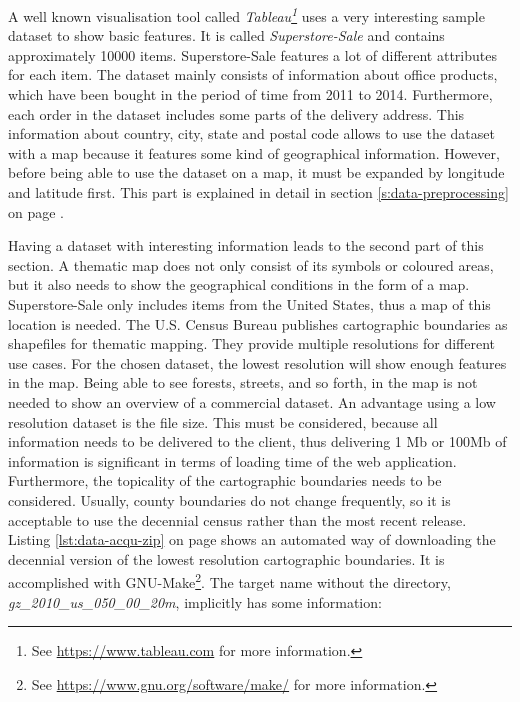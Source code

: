 A well known visualisation tool called \textit{Tableau\footnote{See \href{https://www.tableau.com}{https://www.tableau.com} for more information.}} uses a very interesting sample dataset to show basic features. It is called \textit{Superstore-Sale} and contains approximately 10000 items. Superstore-Sale features a lot of different attributes for each item. The dataset mainly consists of information about office products, which have been bought in the period of time from 2011 to 2014. Furthermore, each order in the dataset includes some parts of the delivery address. This information about country, city, state and postal code allows to use the dataset with a map because it features some kind of geographical information. However, before being able to use the dataset on a map, it must be expanded by longitude and latitude first. This part is explained in detail in section \ref{s:data-preprocessing} on page \pageref{s:data-preprocessing}.

Having a dataset with interesting information leads to the second part of this section. A thematic map does not only consist of its symbols or coloured areas, but it also needs to show the geographical conditions in the form of a map. Superstore-Sale only includes items from the United States, thus a map of this location is needed. The U.S. Census Bureau publishes cartographic boundaries as shapefiles for thematic mapping. They provide multiple resolutions for different use cases. For the chosen dataset, the lowest resolution will show enough features in the map. Being able to see forests, streets, and so forth, in the map is not needed to show an overview of a commercial dataset. An advantage using a low resolution dataset is the file size. This must be considered, because all information needs to be delivered to the client, thus delivering 1 \ac{Mb} or 100\ac{Mb} of information is significant in terms of loading time of the web application.
Furthermore, the topicality of the cartographic boundaries needs to be considered. Usually, county boundaries do not change frequently, so it is acceptable to use the decennial census rather than the most recent release. Listing \ref{lst:data-acqu-zip} on page \pageref{lst:data-acqu-zip} shows an automated way of downloading the decennial version of the lowest resolution cartographic boundaries. It is accomplished with GNU-Make\footnote{See \href{https://www.gnu.org/software/make/}{https://www.gnu.org/software/make/} for more information.}. The target name without the directory, \textit{gz\_2010\_us\_050\_00\_20m}, implicitly has some information:

